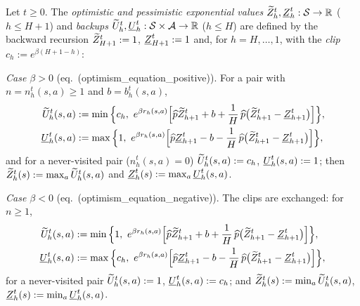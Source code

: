 \begin{definition}\label{def:backups}
\leanok
{}
Let $t \ge 0$. The \emph{optimistic and pessimistic exponential values} $\widetilde{Z}^t_h, \underline{Z}^t_h : \mathcal{S} \to \mathbb{R}$
($h \le H + 1$) and \emph{backups} $\widetilde{U}^t_h, \underline{U}^t_h : \mathcal{S} \times \mathcal{A} \to \mathbb{R}$ ($h \le H$) are defined by the
backward recursion $\widetilde{Z}^t_{H+1} := 1$, $\underline{Z}^t_{H+1} := 1$ and, for $h = H, \dots, 1$, with the
\emph{clip} $c_h := e^{\beta(H + 1 - h)}$:

\emph{Case $\beta > 0$} (eq.~(optimism\_equation\_positive)). For a pair with $n = n_h^t(s, a) \ge 1$
and $b = b_h^t(s, a)$,
\begin{align*}
  \widetilde{U}^t_h(s, a) &:= \min\Big\{ c_h,\ e^{\beta r_h(s, a)} \Big[ \widehat{p} \widetilde{Z}^t_{h+1} + b + \frac1H\, \widehat{p}\big(\widetilde{Z}^t_{h+1} - \underline{Z}^t_{h+1}\big) \Big] \Big\}, \\
  \underline{U}^t_h(s, a) &:= \max\Big\{ 1,\ e^{\beta r_h(s, a)} \Big[ \widehat{p} \underline{Z}^t_{h+1} - b - \frac1H\, \widehat{p}\big(\widetilde{Z}^t_{h+1} - \underline{Z}^t_{h+1}\big) \Big] \Big\},
\end{align*}
and for a never-visited pair ($n_h^t(s, a) = 0$) $\widetilde{U}^t_h(s, a) := c_h$, $\underline{U}^t_h(s, a) := 1$; then
$\widetilde{Z}^t_h(s) := \max_{a} \widetilde{U}^t_h(s, a)$ and $\underline{Z}^t_h(s) := \max_a \underline{U}^t_h(s, a)$.

\emph{Case $\beta < 0$} (eq.~(optimism\_equation\_negative)). The clips are exchanged: for $n \ge 1$,
\begin{align*}
  \widetilde{U}^t_h(s, a) &:= \min\Big\{ 1,\ e^{\beta r_h(s, a)} \Big[ \widehat{p} \widetilde{Z}^t_{h+1} + b + \frac1H\, \widehat{p}\big(\widetilde{Z}^t_{h+1} - \underline{Z}^t_{h+1}\big) \Big] \Big\}, \\
  \underline{U}^t_h(s, a) &:= \max\Big\{ c_h,\ e^{\beta r_h(s, a)} \Big[ \widehat{p} \underline{Z}^t_{h+1} - b - \frac1H\, \widehat{p}\big(\widetilde{Z}^t_{h+1} - \underline{Z}^t_{h+1}\big) \Big] \Big\},
\end{align*}
for a never-visited pair $\widetilde{U}^t_h(s, a) := 1$, $\underline{U}^t_h(s, a) := c_h$; and
$\widetilde{Z}^t_h(s) := \min_a \widetilde{U}^t_h(s, a)$, $\underline{Z}^t_h(s) := \min_a \underline{U}^t_h(s, a)$.
\end{definition}

